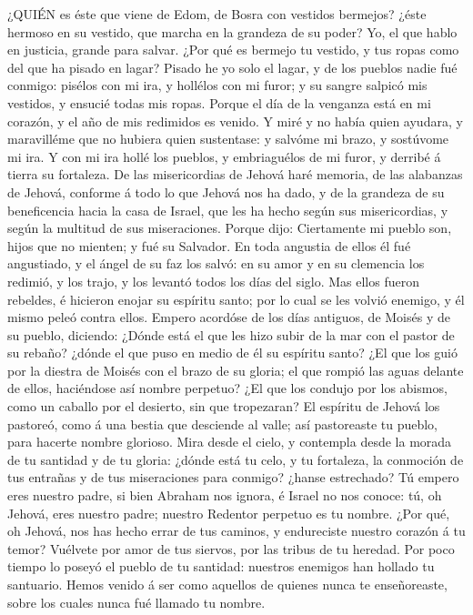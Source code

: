  ¿QUIÉN es éste que viene de Edom, de Bosra con vestidos
bermejos? ¿éste hermoso en su vestido, que marcha en la grandeza de su
poder? Yo, el que hablo en justicia, grande para salvar. 
¿Por qué es bermejo tu vestido, y tus ropas como del que ha pisado en
lagar?  Pisado he yo solo el lagar, y de los pueblos nadie
fué conmigo: pisélos con mi ira, y hollélos con mi furor; y su sangre
salpicó mis vestidos, y ensucié todas mis ropas.  Porque el
día de la venganza está en mi corazón, y el año de mis redimidos es
venido.  Y miré y no había quien ayudara, y maravilléme que
no hubiera quien sustentase: y salvóme mi brazo, y sostúvome mi ira.
 Y con mi ira hollé los pueblos, y embriaguélos de mi furor,
y derribé á tierra su fortaleza.  De las misericordias de
Jehová haré memoria, de las alabanzas de Jehová, conforme á todo lo que
Jehová nos ha dado, y de la grandeza de su beneficencia hacia la casa de
Israel, que les ha hecho según sus misericordias, y según la multitud de
sus miseraciones.  Porque dijo: Ciertamente mi pueblo son,
hijos que no mienten; y fué su Salvador.  En toda angustia
de ellos él fué angustiado, y el ángel de su faz los salvó: en su amor y
en su clemencia los redimió, y los trajo, y los levantó todos los días
del siglo.  Mas ellos fueron rebeldes, é hicieron enojar su
espíritu santo; por lo cual se les volvió enemigo, y él mismo peleó
contra ellos.  Empero acordóse de los días antiguos, de
Moisés y de su pueblo, diciendo: ¿Dónde está el que les hizo subir de la
mar con el pastor de su rebaño? ¿dónde el que puso en medio de él su
espíritu santo?  ¿El que los guió por la diestra de Moisés
con el brazo de su gloria; el que rompió las aguas delante de ellos,
haciéndose así nombre perpetuo?  ¿El que los condujo por
los abismos, como un caballo por el desierto, sin que tropezaran?
 El espíritu de Jehová los pastoreó, como á una bestia que
desciende al valle; así pastoreaste tu pueblo, para hacerte nombre
glorioso.  Mira desde el cielo, y contempla desde la morada
de tu santidad y de tu gloria: ¿dónde está tu celo, y tu fortaleza, la
conmoción de tus entrañas y de tus miseraciones para conmigo? ¿hanse
estrechado?  Tú empero eres nuestro padre, si bien Abraham
nos ignora, é Israel no nos conoce: tú, oh Jehová, eres nuestro padre;
nuestro Redentor perpetuo es tu nombre.  ¿Por qué, oh
Jehová, nos has hecho errar de tus caminos, y endureciste nuestro
corazón á tu temor? Vuélvete por amor de tus siervos, por las tribus de
tu heredad.  Por poco tiempo lo poseyó el pueblo de tu
santidad: nuestros enemigos han hollado tu santuario. 
Hemos venido á ser como aquellos de quienes nunca te enseñoreaste, sobre
los cuales nunca fué llamado tu nombre.

